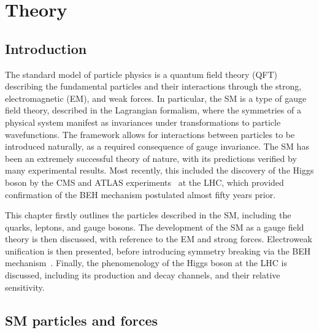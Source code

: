\chapter{Theory}
\label{chap:theory}

\section{Introduction}

The standard model of particle physics is a quantum field theory (QFT) describing the fundamental particles and their interactions through the strong, electromagnetic (EM), and weak forces. In particular, the SM is a type of gauge field theory, described in the Lagrangian formalism, where the symmetries of a physical system manifest as invariances under transformations to particle wavefunctions. The framework allows for interactions between particles to be introduced naturally, as a required consequence of gauge invariance.
The SM has been an extremely successful theory of nature, with its predictions verified by many experimental results. Most recently, this included the discovery of the Higgs boson by the CMS and ATLAS experiments~\cite{Aad:2012tfa,Chatrchyan:2012xdj,Chatrchyan:2013lba} at the LHC, which provided confirmation of the BEH mechanism postulated almost fifty years prior. 

This chapter firstly outlines the particles described in the SM, including the quarks, leptons, and gauge bosons. The development of the SM as a gauge field theory is then discussed, with reference to the EM and strong forces. Electroweak unification is then presented, before introducing symmetry breaking via the BEH mechanism~\cite{BroutEnglert,HiggsBS1,HiggsBS2,HiggsBS3,Kibble}. Finally, the phenomenology of the Higgs boson at the LHC is discussed, including its production and decay channels, and their relative sensitivity.

\section{SM particles and forces}

